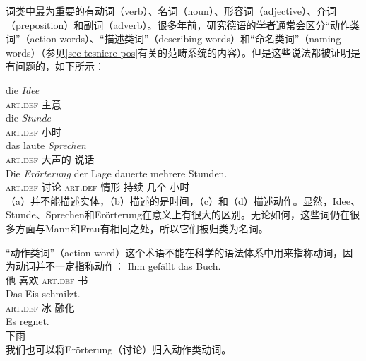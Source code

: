 词类中最为重要的有动词（verb）、名词（noun）、形容词（adjective）、介词（preposition）和副词（adverb）。很多年前，研究德语的学者通常会区分“动作类词”（action words）、“描述类词”（describing words）和“命名类词”（naming words）（参见\ref{sec-tesniere-pos}有关\tesc 的范畴系统的内容）。但是这些说法都被证明是有问题的，如下所示：

\eal
\ex 
\gll die \emph{Idee}\\
	\textsc{art}.\textsc{def} 主意\\
\ex 
\gll die \emph{Stunde}\\
	 \textsc{art}.\textsc{def} 小时\\
\ex 
\gll das laute \emph{Sprechen}\\
     \textsc{art}.\textsc{def} 大声的 说话\\
\ex 
\gll Die \emph{Erörterung} der Lage dauerte mehrere Stunden.\\
     \textsc{art}.\textsc{def} 讨论 \textsc{art}.\textsc{def} 情形 持续 几个 小时\\
\zl
（a）并不能描述实体，（b）描述的是时间，（c）和（d）描述动作。显然，Idee、Stunde、Sprechen和Erörterung在意义上有很大的区别。无论如何，这些词仍在很多方面与Mann和Frau有相同之处，所以它们被归类为名词。

“动作类词”（action word）这个术语不能在科学的语法体系中用来指称动词，因为动词并不一定指称动作：
\eal
\ex
\gll Ihm gefällt das Buch.\\
	 他 喜欢 \textsc{art}.\textsc{def} 书\\
\ex 
\gll Das Eis schmilzt.\\
	 \textsc{art}.\textsc{def} 冰  融化\\
\ex 
\gll Es regnet.\\
	 \expl{} 下雨\\
\zl
我们也可以将Erörterung（讨论）归入动作类动词。

